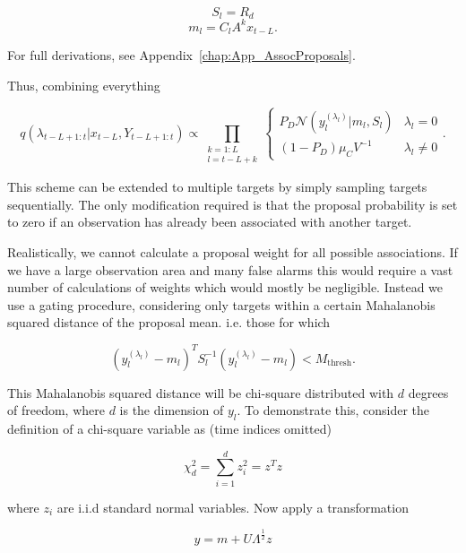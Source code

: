 \begin{equation} S_{l} = R_d \end{equation}
\begin{equation} m_{l} = C_{l} A^k x_{t-L} .\end{equation}

For full derivations, see Appendix~\ref{chap:App_AssocProposals}.

Thus, combining everything

\begin{equation}
q(\lambda_{t-L+1:t}|x_{t-L}, Y_{t-L+1:t}) \propto \prod_{\substack{k=1:L\\l=t-L+k}} \begin{cases}
P_D \mathcal{N}(y_{l}^{(\lambda_{l})}|m_{l}, S_{l}) & \lambda_{l}=0 \\
(1-P_D) \mu_C V^{-1} & \lambda_{l} \ne 0 \end{cases}.
\end{equation}

This scheme can be extended to multiple targets by simply sampling targets sequentially. The only modification required is that the proposal probability is set to zero if an observation has already been associated with another target.

Realistically, we cannot calculate a proposal weight for all possible associations. If we have a large observation area and many false alarms this would require a vast number of calculations of weights which would mostly be negligible. Instead we use a gating procedure, considering only targets within a certain Mahalanobis squared distance of the proposal mean. i.e. those for which

\begin{equation}
(y_{l}^{(\lambda_{l})} - m_{l})^T S_{l}^{-1} (y_{l}^{(\lambda_{l})} - m_{l}) < M_{\text{thresh}}.
\end{equation}

This Mahalanobis squared distance will be chi-square distributed with $d$ degrees of freedom, where $d$ is the dimension of $y_{l}$. To demonstrate this, consider the definition of a chi-square variable as (time indices omitted)

\begin{equation}
\chi_d^2 = \sum_{i=1}^d z_i^2 = z^T z
\end{equation}

where $z_i$ are i.i.d standard normal variables. Now apply a transformation

\begin{equation}
y = m + U \Lambda^{\frac{1}{2}} z
\end{equation}

